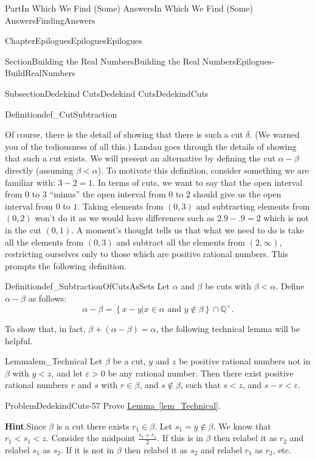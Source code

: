 \documentclass[oneside,10pt,]{book}
\newcommand{\blocktitlefont}{\relax}
\newcommand{\xreffont}{\relax}
\numberwithin{equation}{part}
\newcommand{\eps}{\varepsilon}
\newcommand{\QQ}{\mathbb {Q}}
\newcommand{\lt}{<}
\begin{document}
\begin{partptx}{Part}{In Which We Find (Some) Answers}{}{In Which We Find (Some) Answers}{}{}{FindingAnswers}
\begin{chapterptx}{Chapter}{Epilogues}{}{Epilogues}{}{}{Epilogues}
\begin{sectionptx}{Section}{Building the Real Numbers}{}{Building the Real Numbers}{}{}{Epilogues-BuildRealNumbers}
\begin{subsectionptx}{Subsection}{Dedekind Cuts}{}{Dedekind Cuts}{}{}{DedekindCuts}
\begin{definition}{Definition}{}{def_CutSubtraction}
%
\end{definition}
Of course, there is the detail of showing that there is such a cut \(\delta\).  (We warned you of the tediousness of all this.)  Landau goes through the details of showing that such a cut exists.  We will present an alternative by defining the cut \(\alpha-\beta\) directly (assuming \(\beta\lt \alpha\)).  To motivate this definition, consider something we are familiar with: \(3-2=1\).  In terms of cuts, we want to say that the open interval from \(0\) to \(3\) ``minus'' the open interval from \(0\) to \(2\) should give us the open interval from \(0\) to \(1\).  Taking elements from \((0,3)\) and subtracting elements from \((0,2)\) won't do it as we would have differences such as \(2.9-.9=2\) which is not in the cut \((0,1)\). A moment's thought tells us that what we need to do is take all the elements from \((0,3)\) and subtract all the elements from \((2,\infty)\), restricting ourselves only to those which are positive rational numbers.  This prompts the following definition.%
\begin{definition}{Definition}{}{def_SubtractionOfCutsAsSets}%
%
Let \(\alpha\) and \(\beta\) be cuts with \(\beta\lt \alpha\).  Define \(\alpha-\beta\) as follows:%
\begin{equation*}
\alpha-\beta =\left\{x-y|x\in\alpha \text{ and } y\not\in\beta\right\}\cap\QQ^+\text{.}
\end{equation*}
%
\end{definition}
To show that, in fact, \(\beta+(\alpha-\beta)=\alpha\), the following technical lemma will be helpful.%
\begin{lemma}{Lemma}{}{}{lem_Technical}%
Let \(\beta\) be a cut, \(y\) and \(z\) be positive rational numbers not in \(\beta\) with \(y\lt z\), and let \(\eps>0\) be any rational number.  Then there exist positive rational numbers \(r\) and \(s\) with \(r\in\beta\), and \(s\not\in\beta\), such that \(s\lt z\), and \(s-r\lt \eps\).%
\end{lemma}
\begin{problem}{Problem}{}{DedekindCuts-57}%
Prove \hyperref[lem_Technical]{Lemma~{\xreffont\ref{lem_Technical}}}.%
\par\smallskip%
\noindent\textbf{\blocktitlefont Hint}.\hypertarget{DedekindCuts-57-3}{}\quad{}Since \(\beta\) is a cut there exists \(r_1\in\beta\). Let \(s_1=y\not\in\beta\).  We know that \(r_1\lt s_1\lt
z\).  Consider the midpoint \(\frac{s_1+r_1}{2}\).  If this is in \(\beta\) then relabel it as \(r_2\) and relabel \(s_1\) as \(s_2\).  If it is not in \(\beta\) then relabel it as \(s_2\) and relabel \(r_1\) as \(r_2\), etc.%

\end{problem}
\end{subsectionptx}
\end{sectionptx}
\end{chapterptx}
\end{partptx}
\end{document}

